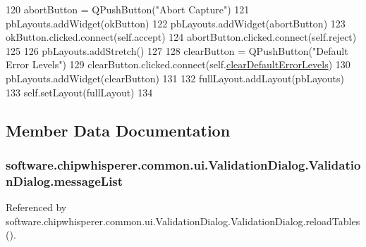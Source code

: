 \begin{DoxyCode}
120             abortButton = QPushButton(\textcolor{stringliteral}{"Abort Capture"})
121             pbLayouts.addWidget(okButton)
122             pbLayouts.addWidget(abortButton)
123             okButton.clicked.connect(self.accept)
124             abortButton.clicked.connect(self.reject)
125 
126         pbLayouts.addStretch()
127 
128         clearButton = QPushButton(\textcolor{stringliteral}{"Default Error Levels"})
129         clearButton.clicked.connect(self.\hyperlink{classsoftware_1_1chipwhisperer_1_1common_1_1ui_1_1ValidationDialog_1_1ValidationDialog_ad39cfafe223df36fd7c88611ec681330}{clearDefaultErrorLevels})
130         pbLayouts.addWidget(clearButton)
131 
132         fullLayout.addLayout(pbLayouts)
133         self.setLayout(fullLayout)
134 \end{DoxyCode}


\subsection{Member Data Documentation}
\hypertarget{classsoftware_1_1chipwhisperer_1_1common_1_1ui_1_1ValidationDialog_1_1ValidationDialog_a03a682a5279012b6da17739a6f62ff42}{}
\subsubsection[{message\+List}]{\setlength{\rightskip}{0pt plus 5cm}software.\+chipwhisperer.\+common.\+ui.\+Validation\+Dialog.\+Validation\+Dialog.\+message\+List}\label{classsoftware_1_1chipwhisperer_1_1common_1_1ui_1_1ValidationDialog_1_1ValidationDialog_a03a682a5279012b6da17739a6f62ff42}


Referenced by software.\+chipwhisperer.\+common.\+ui.\+Validation\+Dialog.\+Validation\+Dialog.\+reload\+Tables().

\hypertarget{classsoftware_1_1chipwhisperer_1_1common_1_1ui_1_1ValidationDialog_1_1ValidationDialog_aa66403c4b375c4e56a8220c4a750be20}{}
